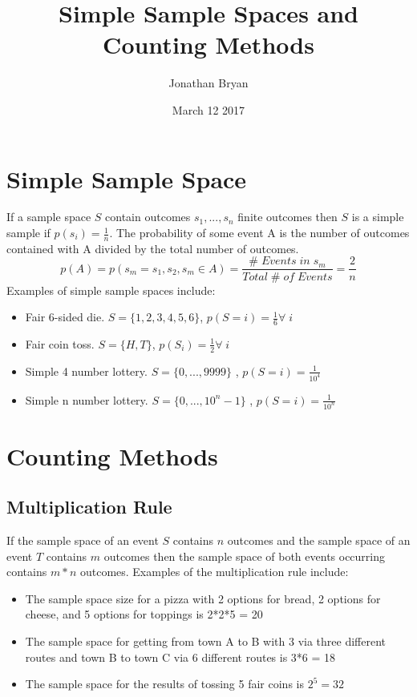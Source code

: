 \documentclass[fleqn]{article}
\title{Simple Sample Spaces and Counting Methods}
\author{Jonathan Bryan}
\date{March 12 2017}
\begin{document}
\maketitle
\newpage
{}
\section{Simple Sample Space} 
If a sample space $S$ contain outcomes $s_1,...,s_n$ finite outcomes then $S$ is a simple sample if $p(s_i) = \frac{1}{n}$. The probability of some event A is the number of outcomes contained with A divided by the total number of outcomes. $$p(A) = p(s_m = s_1, s_2, s_m \in A) = \frac{\# \; Events \; in \; s_m}{Total \; \# \; of \; Events} = \frac{2}{n}$$ Examples of simple sample spaces include:
\begin{itemize}
	\item Fair 6-sided die. $S = \{1,2,3,4,5,6\}$, $p(S = i) = \frac{1}{6} \forall \; i$
	\item Fair coin toss. $S = \{H,T\}$, $p(S_i) = \frac{1}{2} \forall \; i$
	\item Simple 4 number lottery. $S = \{0,...,9999\}$ , $p(S = i) = \frac{1}{10^4}$
	\item Simple n number lottery. $S = \{0,...,10^n - 1\}$ , $p(S = i) = \frac{1}{10^n}$
\end{itemize}
\section{Counting Methods} 
\subsection{Multiplication Rule}
If the sample space of an event $S$ contains $n$ outcomes and the sample space of an event $T$ contains $m$ outcomes then the sample space of both events occurring contains $m*n$ outcomes. Examples of the multiplication rule include:
\begin{itemize}
	\item The sample space size for a pizza with 2 options for bread, 2 options for cheese, and 5 options for toppings is 2*2*5 = 20
	\item The sample space for getting from town A to B with 3 via three different routes and town B to town C via 6 different routes is 3*6 = 18
	\item The sample space for the results of tossing 5 fair coins is $2^5 = 32$
\end{itemize}
\end{document}
